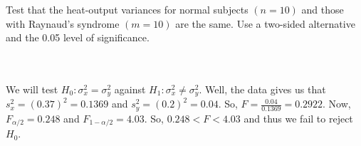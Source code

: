 Test that the heat-output variances for normal subjects $(n=10)$ and those with Raynaud's syndrome
$(m=10)$ are the same. Use a two-sided alternative and the 0.05 level of significance.\\\\

\begin{solution}\renewcommand{\qedsymbol}{}\ \\
    We will test $H_0:\sigma_x^2=\sigma_y^2$ against $H_1:\sigma_x^2\neq\sigma_y^2$. Well, the data
    gives us that $s_x^2=(0.37)^2=0.1369$ and $s_y^2=(0.2)^2=0.04$. So, $F=\frac{0.04}{0.1369}=0.2922$.
    Now, $F_{\alpha/2}=0.248$ and $F_{1-\alpha/2}=4.03$. So, $0.248<F<4.03$ and thus we fail to reject
    $H_0$.

\end{solution}